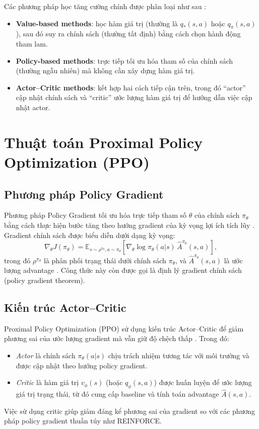 \documentclass{uetgraduation}
\begin{document}
Các phương pháp học tăng cường chính được phân loại như sau \cite{sutton2018}:

\begin{itemize}
    \item \textbf{Value-based methods}: học hàm giá trị (thường là $q_*(s,a)$ hoặc $q_\pi(s,a)$), sau đó suy ra chính sách (thường tất định) bằng cách chọn hành động tham lam.
    \item \textbf{Policy-based methods}: trực tiếp tối ưu hóa tham số của chính sách (thường ngẫu nhiên) mà không cần xây dựng hàm giá trị.
    \item \textbf{Actor–Critic methods}: kết hợp hai cách tiếp cận trên, trong đó ``actor'' cập nhật chính sách và ``critic'' ước lượng hàm giá trị để hướng dẫn việc cập nhật actor.
\end{itemize}

\section{Thuật toán Proximal Policy Optimization (PPO)}\label{sec:ppo}

\subsection{Phương pháp Policy Gradient}

Phương pháp Policy Gradient tối ưu hóa trực tiếp tham số $\theta$ của chính sách $\pi_\theta$ bằng cách thực hiện bước tăng theo hướng gradient của kỳ vọng lợi ích tích lũy \cite{schulman2017}. Gradient chính sách được biểu diễn dưới dạng kỳ vọng:
\[
\nabla_\theta J(\pi_\theta) = \mathbb{E}_{s \sim \rho^{\pi_\theta}, a \sim \pi_\theta} \left[ \nabla_\theta \log \pi_\theta(a|s) \, \hat{A}^{\pi_\theta}(s,a) \right],
\]
trong đó $\rho^{\pi_\theta}$ là phân phối trạng thái dưới chính sách $\pi_\theta$, và $\hat{A}^{\pi_\theta}(s,a)$ là ước lượng advantage \cite{schulman2017}. Công thức này còn được gọi là định lý gradient chính sách (policy gradient theorem).

\subsection{Kiến trúc Actor--Critic}

Proximal Policy Optimization (PPO) sử dụng kiến trúc Actor--Critic để giảm phương sai của ước lượng gradient mà vẫn giữ độ chệch thấp \cite{schulman2017}. Trong đó:
\begin{itemize}
    \item \textit{Actor} là chính sách $\pi_\theta(a|s)$ chịu trách nhiệm tương tác với môi trường và được cập nhật theo hướng policy gradient.
    \item \textit{Critic} là hàm giá trị $v_\phi(s)$ (hoặc $q_\phi(s,a)$) được huấn luyện để ước lượng giá trị trạng thái, từ đó cung cấp baseline và tính toán advantage $\hat{A}(s,a)$.
\end{itemize}
Việc sử dụng critic giúp giảm đáng kể phương sai của gradient so với các phương pháp policy gradient thuần túy như REINFORCE.
\end{document}
